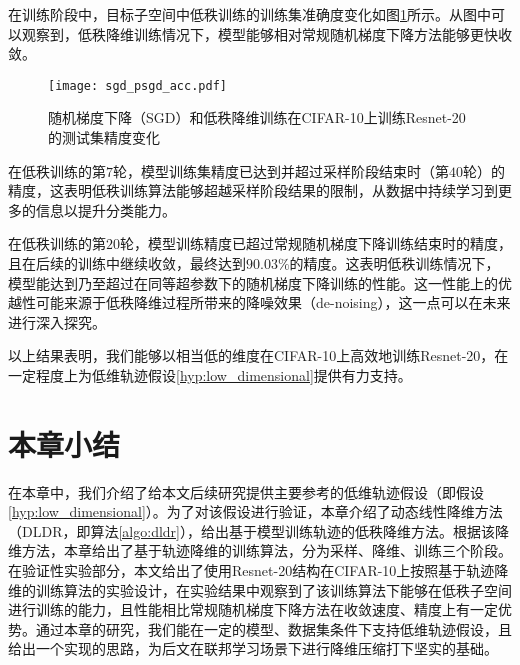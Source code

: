 在训练阶段中，目标子空间中低秩训练的训练集准确度变化如图\ref{fig:dldr:training}所示。从图中可以观察到，低秩降维训练情况下，模型能够相对常规随机梯度下降方法能够更快收敛。

\begin{figure}[!htp]
    \centering
    \texttt{[image: sgd\_psgd\_acc.pdf]}
    \caption[中心化低秩降维实验测试集精度变化]
      {随机梯度下降（SGD）和低秩降维训练在CIFAR-10上训练Resnet-20的测试集精度变化}
   \label{fig:dldr:training}
  \end{figure}

在低秩训练的第$7$轮，模型训练集精度已达到并超过采样阶段结束时（第$40$轮）的精度，这表明低秩训练算法能够超越采样阶段结果的限制，从数据中持续学习到更多的信息以提升分类能力。

在低秩训练的第$20$轮，模型训练精度已超过常规随机梯度下降训练结束时的精度，且在后续的训练中继续收敛，最终达到$90.03\%$的精度。这表明低秩训练情况下，模型能达到乃至超过在同等超参数下的随机梯度下降训练的性能。这一性能上的优越性可能来源于低秩降维过程所带来的降噪效果（de-noising），这一点可以在未来进行深入探究。

以上结果表明，我们能够以相当低的维度在CIFAR-10上高效地训练Resnet-20，在一定程度上为低维轨迹假设\ref{hyp:low_dimensional}提供有力支持。

\section{本章小结}

在本章中，我们介绍了给本文后续研究提供主要参考的低维轨迹假设（即假设\ref{hyp:low_dimensional}）。为了对该假设进行验证，本章介绍了动态线性降维方法（DLDR，即算法\ref{algo:dldr}），给出基于模型训练轨迹的低秩降维方法。根据该降维方法，本章给出了基于轨迹降维的训练算法，分为采样、降维、训练三个阶段。在验证性实验部分，本文给出了使用Resnet-20结构在CIFAR-10上按照基于轨迹降维的训练算法的实验设计，在实验结果中观察到了该训练算法下能够在低秩子空间进行训练的能力，且性能相比常规随机梯度下降方法在收敛速度、精度上有一定优势。通过本章的研究，我们能在一定的模型、数据集条件下支持低维轨迹假设，且给出一个实现的思路，为后文在联邦学习场景下进行降维压缩打下坚实的基础。



